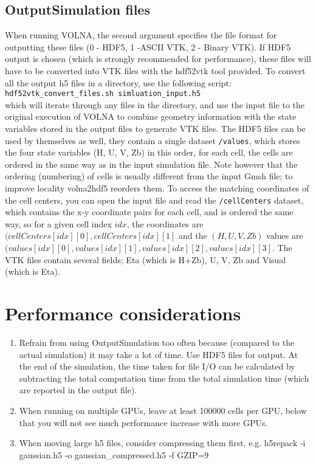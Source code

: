 \documentclass[11pt]{article}
\begin{document}
\subsection{OutputSimulation files}
When running VOLNA, the second argument specifies the file format for outputting these files (0 - HDF5, 1 -ASCII VTK, 2 - Binary VTK). If HDF5 output is chosen (which is strongly recommended for performance), these files will have to be converted into VTK files with the hdf52vtk tool provided. To convert all the output h5 files in a directory, use the following script:\\
{\tt hdf52vtk\_convert\_files.sh simluation\_input.h5}\\
which will iterate through any files in the directory, and use the input file to the original execution of VOLNA to combine geometry information with the state variables stored in the output files to generate VTK files.
The HDF5 files can be used by themselves as well, they contain a single dataset \texttt{/values}, which stores the four state variables (H, U, V, Zb) in this order, for each cell, the cells are ordered in the same way as in the input simulation file. Note however that the ordering (numbering) of cells is usually different from the input Gmsh file; to improve locality volna2hdf5 reorders them. To access the matching coordinates of the cell centers, you can open the input file and read the \texttt{/cellCenters} dataset, which contains the x-y coordinate pairs for each cell, and is ordered the same way, so for a given cell index $idx$, the coordinates are $(cellCenters[idx][0], cellCenters[idx][1]$ and the $(H,U,V,Zb)$ values are $(values[idx][0],values[idx][1],values[idx][2],values[idx][3]$.
The VTK files contain several fields; Eta (which is H+Zb), U, V, Zb and Visual (which is Eta). 

\section{Performance considerations}
\begin{enumerate}
\item Refrain from using OutputSimulation too often because (compared to the actual simulation) it may take a lot of time. Use HDF5 files for output. At the end of the simulation, the time taken for file I/O can be calculated by subtracting the total computation time from the total simulation time (which are reported in the output file).
\item When running on multiple GPUs, leave at least 100000 cells per GPU, below that you will not see much performance increase with more GPUs. 
\item When moving large h5 files, consider compressing them first, e.g. h5repack -i gaussian.h5 -o gaussian\_compressed.h5 -f GZIP=9
\end{enumerate}
\end{document}
